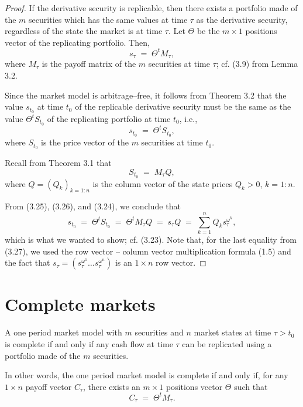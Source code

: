 

\begin{proof}
If the derivative security is replicable, then there exists a portfolio
made of the $m$ securities which has the same values at time $\tau$ as the
derivative security, regardless of the state the market is at time $\tau$.
Let $\Theta$ be the $m \times 1$ positions vector of the replicating
portfolio. Then,
\begin{equation}
s_\tau \;=\; \Theta^t M_\tau,
\end{equation}
where $M_\tau$ is the payoff matrix of the $m$ securities at time $\tau$;
cf. (3.9) from Lemma 3.2.

Since the market model is arbitrage--free, it follows from Theorem 3.2 that
the value $s_{t_0}$ at time $t_0$ of the replicable derivative security
must be the same as the value $\Theta^t S_{t_0}$ of the replicating
portfolio at time $t_0$, i.e.,
\begin{equation}
s_{t_0} \;=\; \Theta^t S_{t_0},
\end{equation}
where $S_{t_0}$ is the price vector of the $m$ securities at time $t_0$.

Recall from Theorem 3.1 that
\begin{equation}
S_{t_0} \;=\; M_\tau Q,
\end{equation}
where $Q = (Q_k)_{k=1:n}$ is the column vector of the state prices $Q_k >
0$, $k = 1:n$.

From (3.25), (3.26), and (3.24), we conclude that
\begin{equation}
s_{t_0} \;=\; \Theta^t S_{t_0} \;=\; \Theta^t M_\tau Q \;=\; s_\tau Q \;=\;
\sum_{k=1}^n Q_k s_\tau^{\omega^k},
\end{equation}
which is what we wanted to show; cf. (3.23). Note that, for the last
equality from (3.27), we used the row vector -- column vector
multiplication formula (1.5) and the fact that $s_\tau = (s_\tau^{\omega^1}
\ldots s_\tau^{\omega^n})$ is an $1 \times n$ row vector.
\end{proof}

\section{Complete markets}

\begin{definition}
A one period market model with $m$ securities and $n$ market states at time
$\tau > t_0$ is complete if and only if any cash flow at time $\tau$ can be
replicated using a portfolio made of the $m$ securities.

In other words, the one period market model is complete if and only if,
for any $1 \times n$ payoff vector $C_\tau$, there exists an $m \times 1$
positions vector $\Theta$ such that
\begin{equation}
C_\tau \;=\; \Theta^t M_\tau.
\end{equation}
\end{definition}

